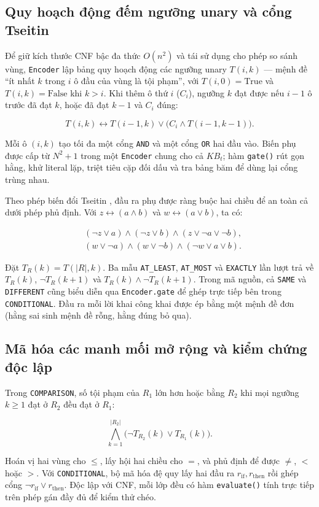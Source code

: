 \clearpage
\begingroup{}

\subsection{Quy hoạch động đếm ngưỡng unary và cổng Tseitin}

Để giữ kích thước CNF bậc đa thức $O(n^2)$ và tái sử dụng cho phép so sánh vùng, \texttt{Encoder} lập bảng quy hoạch động các ngưỡng unary $T(i,k)$ — mệnh đề “ít nhất $k$ trong $i$ ô đầu của vùng là tội phạm”, với $T(i,0)=\mathrm{True}$ và $T(i,k)=\mathrm{False}$ khi $k>i$. Khi thêm ô thứ $i$ ($C_i$), ngưỡng $k$ đạt được nếu $i-1$ ô trước đã đạt $k$, hoặc đã đạt $k-1$ và $C_i$ đúng:

\[
T(i,k)\leftrightarrow T(i-1,k)\lor\bigl(C_i\land T(i-1,k-1)\bigr).
\]

Mỗi ô $(i,k)$ tạo tối đa một cổng \texttt{AND} và một cổng \texttt{OR} hai đầu vào. Biến phụ được cấp từ $N^2+1$ trong một \texttt{Encoder} chung cho cả $KB_t$; hàm \texttt{gate()} rút gọn hằng, khử literal lặp, triệt tiêu cặp đối dấu và tra bảng băm để dùng lại cổng trùng nhau.

Theo phép biến đổi Tseitin \cite{tseitin1983complexity}, đầu ra phụ được ràng buộc hai chiều để an toàn cả dưới phép phủ định. Với $z\leftrightarrow(a\land b)$ và $w\leftrightarrow(a\lor b)$, ta có:

\[
\begin{aligned}
&(\neg z\lor a)\land(\neg z\lor b)\land(z\lor\neg a\lor\neg b),\\
&(w\lor\neg a)\land(w\lor\neg b)\land(\neg w\lor a\lor b).
\end{aligned}
\]

Đặt $T_R(k)=T(|R|,k)$. Ba mẫu \texttt{AT\_LEAST}, \texttt{AT\_MOST} và \texttt{EXACTLY} lần lượt trả về $T_R(k)$, $\neg T_R(k+1)$ và $T_R(k)\land\neg T_R(k+1)$. Trong mã nguồn, cả \texttt{SAME} và \texttt{DIFFERENT} cũng biểu diễn qua \texttt{Encoder.gate} để ghép trực tiếp bên trong \texttt{CONDITIONAL}. Đầu ra mỗi lời khai công khai được ép bằng một mệnh đề đơn (hằng sai sinh mệnh đề rỗng, hằng đúng bỏ qua).

\subsection{Mã hóa các manh mối mở rộng và kiểm chứng độc lập}

Trong \texttt{COMPARISON}, số tội phạm của $R_1$ lớn hơn hoặc bằng $R_2$ khi mọi ngưỡng $k\ge 1$ đạt ở $R_2$ đều đạt ở $R_1$:

\[
\bigwedge_{k=1}^{|R_2|}\bigl(\neg T_{R_2}(k)\lor T_{R_1}(k)\bigr).
\]

Hoán vị hai vùng cho $\le$, lấy hội hai chiều cho $=$, và phủ định để được $\ne$, $<$ hoặc $>$. Với \texttt{CONDITIONAL}, bộ mã hóa đệ quy lấy hai đầu ra $r_{\mathrm{if}},r_{\mathrm{then}}$ rồi ghép cổng $\neg r_{\mathrm{if}}\lor r_{\mathrm{then}}$. Độc lập với CNF, mỗi lớp đều có hàm \texttt{evaluate()} tính trực tiếp trên phép gán đầy đủ để kiểm thử chéo.

\par\endgroup

